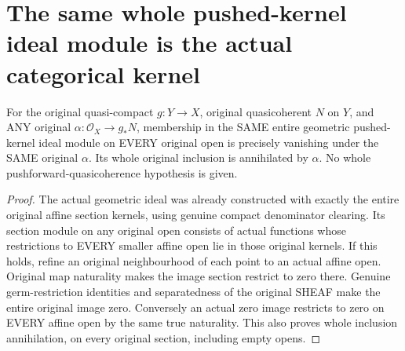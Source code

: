 \section{The same whole pushed-kernel ideal module is the actual categorical kernel}
\label{sec:pushforward-kernel-ideal-module}

\begin{theorem}
\label{sc0-pushed-kernel-module:all-original-opens}
\leanok
For the original quasi-compact $g:Y\to X$, original quasicoherent
$N$ on $Y$, and ANY original $\alpha:\mathcal O_X\to g_*N$,
membership in the SAME entire geometric pushed-kernel ideal module
on EVERY original open is precisely vanishing under the SAME
original $\alpha$. Its whole original inclusion is annihilated
by $\alpha$. No whole pushforward-quasicoherence hypothesis is given.
\end{theorem}
\begin{proof}
The actual geometric ideal was already constructed with exactly
the entire original affine section kernels, using genuine compact
denominator clearing. Its section module on any original open
consists of actual functions whose restrictions to EVERY smaller
affine open lie in those original kernels. If this holds, refine
an original neighbourhood of each point to an actual affine open.
Original map naturality makes the image section restrict to zero
there. Genuine germ-restriction identities and separatedness of
the original SHEAF make the entire original image zero. Conversely
an actual zero image restricts to zero on EVERY affine open by
the same true naturality. This also proves whole inclusion
annihilation, on every original section, including empty opens.
\end{proof}

